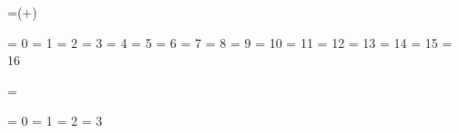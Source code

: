 


\unprotect


\long{}

\mathchardef\etexversion=\numexpr(+\expandafter\gobbleoneargument\eTeXrevision)


\chardef\@@bottomlevelgroup   =  0
\chardef\@@simplegroup        =  1
\chardef\@@hboxgroup          =  2
\chardef\@@adjustedhboxgroup  =  3
\chardef\@@vboxgroup          =  4
\chardef\@@vtopgroup          =  5
\chardef\@@aligngroup         =  6
\chardef\@@noaligngroup       =  7
\chardef\@@outputgroup        =  8
\chardef\@@mathgroup          =  9
\chardef\@@discretionarygroup = 10
\chardef\@@insertgroup        = 11
\chardef\@@vcentergroup       = 12
\chardef\@@mathchoicegroup    = 13
\chardef\@@semisimplegroup    = 14
\chardef\@@mathshiftgroup     = 15
\chardef\@@mathleftgroup      = 16

\chardef\@@vadjustgroup       = \@@insertgroup


\chardef\@@batchmode     = 0
\chardef\@@nonstopmode   = 1
\chardef\@@scrollmode    = 2
\chardef\@@errorstopmode = 3

